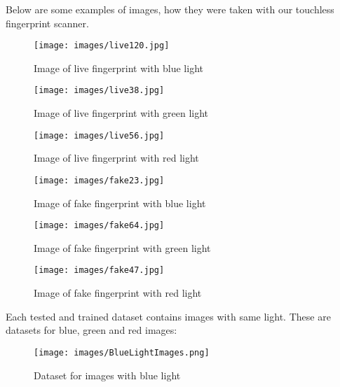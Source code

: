 \documentclass{article}
\begin{document}
Below are some examples of images, how they were taken with our touchless fingerprint scanner.\\

\begin{figure}[htbp]
  \begin{minipage}[b]{0.3\linewidth}
    \centering
    \texttt{[image: images/live120.jpg]}
    \caption{Image of live fingerprint with blue light}
  \end{minipage}
  \hspace{0.3cm}
  \begin{minipage}[b]{0.3\linewidth}
    \centering
    \texttt{[image: images/live38.jpg]}
    \caption{Image of live fingerprint with green light}
  \end{minipage}
  \hspace{0.3cm}
    \begin{minipage}[b]{0.3\linewidth}
    \centering
    \texttt{[image: images/live56.jpg]}
    \caption{Image of live fingerprint with red light}
  \end{minipage}
\end{figure}

\begin{figure}[htbp]
  \begin{minipage}[b]{0.3\linewidth}
    \centering
    \texttt{[image: images/fake23.jpg]}
    \caption{Image of fake fingerprint with blue light}
  \end{minipage}
  \hspace{0.3cm}
  \begin{minipage}[b]{0.3\linewidth}
    \centering
    \texttt{[image: images/fake64.jpg]}
    \caption{Image of fake fingerprint with green light}
  \end{minipage}
  \hspace{0.3cm}
    \begin{minipage}[b]{0.3\linewidth}
    \centering
    \texttt{[image: images/fake47.jpg]}
    \caption{Image of fake fingerprint with red light}
  \end{minipage}
\end{figure}

Each tested and trained dataset contains images with same light. These are datasets for blue, green and red images:
\begin{figure}[htbp]
    \centering
    \texttt{[image: images/BlueLightImages.png]}
    \caption{Dataset for images with blue light}
\end{figure}
\end{document}
